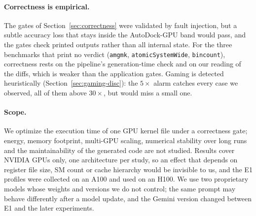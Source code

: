 \paragraph{Correctness is empirical.}
The gates of Section~\ref{sec:correctness} were validated by fault injection, but a subtle accuracy
loss that stays inside the AutoDock-GPU band would pass, and the gates check printed outputs rather
than all internal state. For the three benchmarks that print no verdict (\texttt{amgmk},
\texttt{atomicSystemWide}, \texttt{bincount}), correctness rests on the pipeline's generation-time
check and on our reading of the diffs, which is weaker than the application gates. Gaming is detected
heuristically (Section~\ref{sec:gaming-disc}): the $5\times$ alarm catches every case we observed,
all of them above $30\times$, but would miss a small one.

\paragraph{Scope.}
We optimize the execution time of one GPU kernel file under a correctness gate; energy, memory
footprint, multi-GPU scaling, numerical stability over long runs and the maintainability of the
generated code are not studied. Results cover NVIDIA GPUs only, one architecture per study, so an
effect that depends on register file size, SM count or cache hierarchy would be invisible to us, and
the E1 profiles were collected on an A100 and used on an H100. We use two proprietary models whose
weights and versions we do not control; the same prompt may behave differently after a model update,
and the Gemini version changed between E1 and the later experiments.
